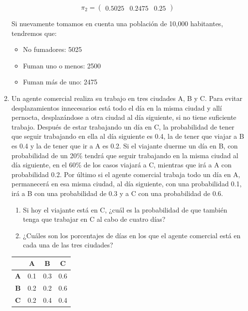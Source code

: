 \documentclass{templateNote}
\begin{document}
\begin{enumerate}
    \begin{equation*}
        \pi_{2} = 
        \begin{pmatrix}
            0.5025 & 0.2475 & 0.25
        \end{pmatrix}
    \end{equation*}

    Si nuevamente tomamos en cuenta una población de 10,000 habitantes, tendremos que:
    \begin{itemize}
        \item No fumadores: 5025
        \item Fuman uno o menos: 2500
        \item Fuman más de uno: 2475
    \end{itemize}

    \newpage
    \item Un agente comercial realiza su trabajo en tres ciudades A, B y C. Para evitar
    desplazamientos innecesarios está todo el día en la misma ciudad y allí
    pernocta, desplazándose a otra ciudad al día siguiente, si no tiene suficiente
    trabajo. Después de estar trabajando un día en C, la probabilidad de tener que
    seguir trabajando en ella al día siguiente es 0.4, la de tener que viajar a B es 0.4
    y la de tener que ir a A es 0.2. Si el viajante duerme un día en B, con
    probabilidad de un 20\% tendrá que seguir trabajando en la misma ciudad al día
    siguiente, en el 60\% de los casos viajará a C, mientras que irá a A con
    probabilidad 0.2. Por último si el agente comercial trabaja todo un día en A,
    permanecerá en esa misma ciudad, al día siguiente, con una probabilidad 0.1,
    irá a B con una probabilidad de 0.3 y a C con una probabilidad de 0.6.

    \begin{enumerate}[label=\alph*)]
        \item Si hoy el viajante está en C, ¿cuál es la probabilidad de que también tenga que trabajar en C al cabo de cuatro días?
        \item ¿Cuáles son los porcentajes de días en los que el agente comercial está en cada una de las tres ciudades?
    \end{enumerate}

    \begin{table}[H]
        \centering
        \begin{tabular}{|c|c|c|c|}
            \hline
            & \textbf{A} & \textbf{B} & \textbf{C} \\ \hline
            \textbf{A} & 0.1 & 0.3 & 0.6 \\
            \textbf{B} & 0.2 & 0.2 & 0.6 \\
            \textbf{C} & 0.2 & 0.4 & 0.4 \\\hline
        \end{tabular}
    \end{table}


\end{enumerate}
\end{document}
